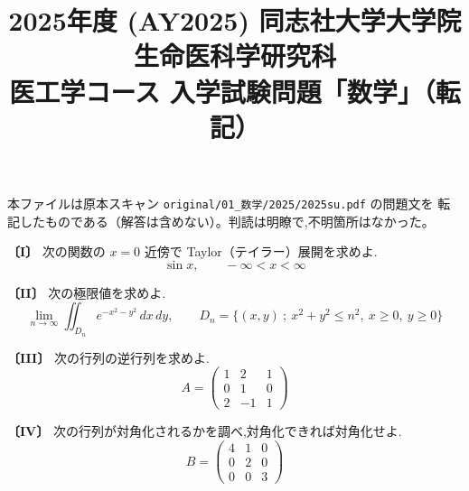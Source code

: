 \documentclass[11pt,a4paper]{article}
\title{2025年度 (AY2025) 同志社大学大学院 生命医科学研究科\\
医工学コース 入学試験問題「数学」（転記）}
\author{}
\date{}
\begin{document}
\maketitle
\vspace{-3em}

\begin{rem}
本ファイルは原本スキャン \texttt{original/01\_数学/2025/2025su.pdf} の問題文を
転記したものである（解答は含めない）。判読は明瞭で,不明箇所はなかった。
\end{rem}

\bigskip

\noindent\textbf{〔I〕} 次の関数の $x=0$ 近傍で Taylor（テイラー）展開を求めよ.
\[
\sin x,\qquad -\infty<x<\infty
\]

\bigskip

\noindent\textbf{〔II〕} 次の極限値を求めよ.
\[
\lim_{n\to\infty}\iint_{D_n} e^{-x^2-y^2}\,dx\,dy,
\qquad
D_n=\bigl\{(x,y)\ ;\ x^2+y^2\le n^2,\ x\ge0,\ y\ge0\bigr\}
\]

\bigskip

\noindent\textbf{〔III〕} 次の行列の逆行列を求めよ.
\[
A=\begin{pmatrix}1&2&1\\0&1&0\\2&-1&1\end{pmatrix}
\]

\bigskip

\noindent\textbf{〔IV〕} 次の行列が対角化されるかを調べ,対角化できれば対角化せよ.
\[
B=\begin{pmatrix}4&1&0\\0&2&0\\0&0&3\end{pmatrix}
\]
\end{document}

